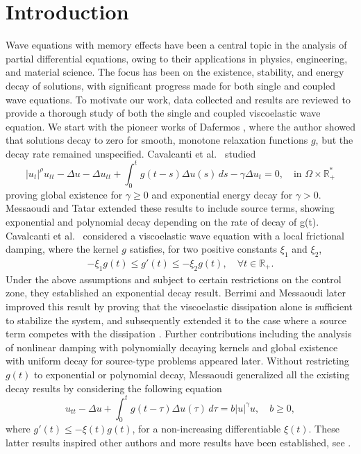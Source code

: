 \documentclass[reqno]{amsart}
\begin{document}
\maketitle
{}
\newtheorem{theorem}{Theorem}[section]
\newtheorem{lemma}[theorem]{Lemma}
\newtheorem{proposition}[theorem]{Proposition}
\newtheorem{remark}[theorem]{Remark}
\allowdisplaybreaks

 \section{Introduction}
 
 Wave equations with memory effects have been a central topic in the analysis of partial
 differential equations, owing to their applications in physics, engineering, and material
 science. The focus has been on the existence, stability, and energy decay of solutions, with significant progress made for both single and coupled wave equations.
 To motivate our work, data collected and results are reviewed to provide a thorough study of
 both the single and coupled viscoelastic wave equation. We start with the pioneer works of Dafermos \cite{Dafermos1, Dafermos2}, where the author showed that solutions decay to zero
 for smooth, monotone relaxation functions $g$, but the decay rate remained unspecified. Cavalcanti et al.\ \cite{CavalcantiDS} studied
\[
|u_t|^\rho u_{tt} - \Delta u - \Delta u_{tt} + \int_0^t g(t - s) \Delta u(s) \, ds - \gamma \Delta u_t = 0,\quad \text{in } \Omega \times \mathbb{R}^{*}_{+}
\]
proving global existence for $\gamma \geq 0$ and exponential energy decay for $\gamma > 0$. Messaoudi and Tatar \cite{MTatar1, MTatar2} extended these results to include source terms, showing exponential and polynomial decay depending on the rate of decay of g(t).
Cavalcanti et al.\ \cite{CavalcantiFerreira} considered a viscoelastic wave equation with a
local frictional damping, where the kernel $g$ satisfies, for two positive constants $\xi_1$
and $\xi_2$,
\begin{align*}
-\xi_1 g(t) \leq g'(t) \leq -\xi_2 g(t), \quad \forall t \in \mathbb{R}_{+}.
\end{align*}
Under the above assumptions and subject to certain restrictions on the control zone, they established an exponential decay result. Berrimi and Messaoudi \cite{Berrimi2004} later
improved this result by proving that the viscoelastic dissipation alone is sufficient to stabilize the system, and subsequently extended it to the case where a source term competes with the dissipation \cite{Berrimi2006}.
Further contributions including the analysis of nonlinear damping with polynomially decaying kernels \cite{Cavalcanti2003} and global existence with uniform decay for source-type problems \cite{Li2011}  appeared later.
 Without restricting $g(t)$ to exponential or polynomial decay, Messaoudi \cite{SMessaoudi1, SMessaoudi2} generalized all the existing decay results by considering the following equation
\[
u_{tt} - \Delta u + \int_0^t g(t - \tau) \Delta u(\tau) \, d\tau = b |u|^{\gamma} u,\quad b \geq 0,
\]
where $g'(t) \leq -\xi(t) g(t)$, for a non-increasing differentiable $\xi(t)$.
These latter results inspired other authors and more results have been established, see \cite{SaidH2011, Hao, PJS, WSH, MessaoudiMustafa}.
\end{document}
